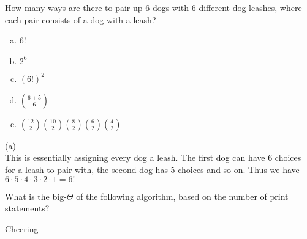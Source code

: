 How many ways are there to pair up 6 dogs with 6 different dog leashes, where each pair consists of a dog with a leash?

\begin{enumerate}[(a)]
	\item  6!

	\item  $2^6$

	\item  $(6!)^2$

	\item  $\binom{6+5}{6}$

	\item  $\binom{12}{2}\binom{10}{2}\binom{8}{2}\binom{6}{2}\binom{4}{2}$

\end{enumerate}
\begin{solution}

(a) \\
This is essentially assigning every dog a leash. The first dog can have 6 choices for a leash to pair with, the second dog has 5 choices and so on. Thus we have $6\cdot 5\cdot 4\cdot 3\cdot 2\cdot 1=6!$

\end{solution}


What is the big-$\Theta$ of the following algorithm, based on the number of print statements?

\begin{algorithm}[H]
    \DontPrintSemicolon
    \BlankLine
     \caption{Cheering}
\end{algorithm}

